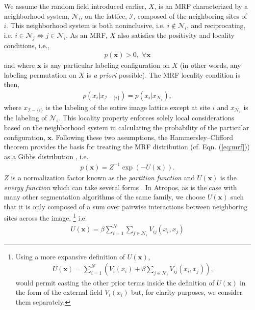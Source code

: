 \documentclass[11pt,english]{article}
\begin{document}
We assume the random field introduced earlier, $X$, is an MRF characterized by a neighborhood system, $\mathcal{N}_i$, on the lattice, $\mathcal{I}$, composed of the neighboring sites of $i$.  This neighborhood system is both noninclusive, i.e. $i \notin \mathcal{N}_i$, and reciprocating, i.e. $i \in \mathcal{N}_j \Leftrightarrow j \in \mathcal{N}_i$.   As an MRF, $X$ also satisfies the positivity and locality conditions, i.e., 
 \begin{align} \label{eq:mrf}
  p(\mathbf{x}) > 0, \,\, \forall\mathbf{x} 
 \end{align}
and where $\mathbf{x}$ is any particular labeling configuration on $X$ (in
other words, any labeling permutation on $X$ is {\em a priori}
possible).  The MRF locality condition is then, 
\begin{align}
  p\left(x_i | x_{\mathcal{I}-\{i\}}\right) = p\left(x_i | x_{\mathcal{N}_i}\right),
\end{align}
where $x_{\mathcal{I}-\{i\}}$ is the labeling of the entire image lattice except at site $i$ and  $x_{\mathcal{N}_i}$ is the labeling of $\mathcal{N}_i$.  This locality property enforces solely local considerations based on the neighborhood system in calculating the probability of the particular configuration, $\mathbf{x}$.  Following these two assumptions, the Hammersley--Clifford theorem provides the basis for treating the MRF distribution (cf. Eqn. (\ref{eq:mrf})) as a Gibbs distribution \citep{Besag1974,Geman1984}, i.e.
\begin{align} \label{eq:gibbs}
p(\mathbf{x}) = Z^{-1} \exp\left(-U(\mathbf{x})\right).
\end{align}
$Z$ is a normalization factor known as the {\em partition function}
and $U(\mathbf{x})$ is the {\em energy function} which can take
several forms \citep{Li2001}. In Atropos, as is the case with many
other segmentation algorithms of the same family, we choose
$U(\mathbf{x})$ such that it is only composed of a sum over pairwise
interactions between neighboring sites across the image,%
\footnote{
Using a more expansive definition of  $U(\mathbf{x})$, 
\begin{align}
U(\mathbf{x}) = \sum_{i = 1}^N \left( V_i(x_i) + \beta \sum_{j \in \mathcal{N}_i} V_{ij}( x_i, x_j ) \right), 
\end{align}
would permit casting the other prior terms inside the definition of $U(\mathbf{x})$ in the form of the external field $V_i(x_i)$ but, for clarity purposes, we consider them separately. 
}
i.e.
\begin{align}\label{eq:U}
U(\mathbf{x}) = \beta \sum_{i = 1}^N \sum_{j \in \mathcal{N}_i} V_{ij}( x_i, x_j )
\end{align}
\end{document}
